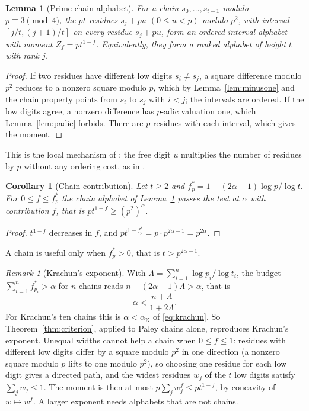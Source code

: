 \documentclass[11pt]{article}
\newtheorem{lemma}[theorem]{Lemma}
\newtheorem{corollary}[theorem]{Corollary}
\theoremstyle{definition}
\theoremstyle{remark}
\newtheorem{remark}[theorem]{Remark}
\begin{document}
\begin{lemma}[Prime-chain alphabet]\label{lem:chain}
For a chain $s_0,\ldots,s_{t-1}$ modulo $p\equiv3\pmod4$, the $pt$ residues
$s_j+pu$ $(0\le u<p)$ modulo $p^2$, with interval $[j/t,(j+1)/t]$ on every
residue $s_j+pu$, form an ordered interval alphabet with moment
$Z_f=pt^{1-f}$. Equivalently, they form a ranked alphabet of height $t$ with
rank $j$.
\end{lemma}
\begin{proof}
If two residues have different low digits $s_i\ne s_j$, a square difference
modulo $p^2$ reduces to a nonzero square modulo $p$, which by
Lemma~\ref{lem:minusone} and the chain property points from $s_i$ to $s_j$
with $i<j$; the intervals are ordered. If the low digits agree, a nonzero
difference has $p$-adic valuation one, which Lemma~\ref{lem:padic} forbids.
There are $p$ residues with each interval, which gives the moment.
\end{proof}
This is the local mechanism of \cite{Krachun2026}; the free digit $u$
multiplies the number of residues by $p$ without any ordering cost, as in
\cite{Ruzsa1984}.

\begin{corollary}[Chain contribution]\label{cor:chainpower}
Let $t\ge2$ and $f_p^*=1-(2\alpha-1)\log p/\log t$. For $0\le f\le f_p^*$ the chain
alphabet of Lemma~\ref{lem:chain} passes the test at $\alpha$ with
contribution $f$, that is $pt^{1-f}\ge(p^2)^\alpha$.
\end{corollary}
\begin{proof}
$t^{1-f}$ decreases in $f$, and $pt^{1-f_p^*}=p\cdot p^{2\alpha-1}=p^{2\alpha}$.
\end{proof}
A chain is useful only when $f_p^*>0$, that is $t>p^{2\alpha-1}$.

\begin{remark}[Krachun's exponent]\label{rem:krachun}
With $\Lambda=\sum_{i=1}^{n}\log p_i/\log t_i$, the budget
$\sum_{i=1}^nf_{p_i}^*>\alpha$ for $n$ chains reads
$n-(2\alpha-1)\Lambda>\alpha$, that is
\[
 \alpha<\frac{n+\Lambda}{1+2\Lambda}.
\]
For Krachun's ten chains this is $\alpha<\alpha_{\mathrm K}$ of
\eqref{eq:krachun}. So Theorem~\ref{thm:criterion}, applied to Paley chains
alone, reproduces Krachun's exponent. Unequal widths cannot help a chain when
$0\le f\le1$: residues with different low digits differ by a square modulo
$p^2$ in one direction (a nonzero square modulo $p$ lifts to one modulo $p^2$),
so choosing one residue for each low digit gives a directed path, and the
widest residues $w_j$ of the $t$ low digits satisfy $\sum_jw_j\le1$. The
moment is then at most $p\sum_jw_j^f\le pt^{1-f}$, by concavity of
$w\mapsto w^f$. A larger exponent needs alphabets that are not chains.
\end{remark}
\end{document}
